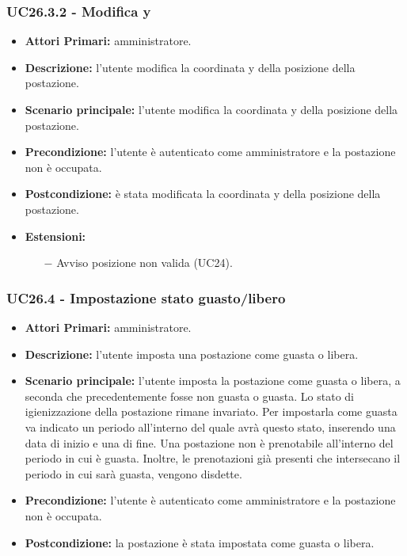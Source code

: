 \subsubsection{ UC26.3.2 - Modifica y}
\begin{itemize}
	\item\textbf{Attori Primari:}
	amministratore.
	\item\textbf{Descrizione:}
	l'utente modifica la coordinata y della posizione della postazione.
	\item\textbf{Scenario principale:} 
	l'utente modifica la coordinata y della posizione della postazione.
	\item\textbf{Precondizione:} 
	l'utente è autenticato come amministratore e la postazione non è occupata.
	\item\textbf{Postcondizione:}
	è stata modificata la coordinata y della posizione della postazione.
	\item\textbf{Estensioni:}
	\begin{itemize}
		\item[$-$] Avviso posizione non valida (UC24).
	\end{itemize}
\end{itemize}

\subsubsection{ UC26.4 - Impostazione stato guasto/libero}
\begin{itemize}
	\item\textbf{Attori Primari:}
	amministratore.
	\item\textbf{Descrizione:}
	l'utente imposta una postazione come guasta o libera.
	\item\textbf{Scenario principale:} 
	l'utente imposta la postazione come guasta o libera, a seconda che precedentemente fosse non guasta o guasta. Lo stato di igienizzazione della postazione rimane invariato. Per impostarla come guasta va indicato un periodo all'interno del quale avrà questo stato, inserendo una data di inizio e una di fine. \newline
	Una postazione non è prenotabile all'interno del periodo in cui è guasta. Inoltre, le prenotazioni già presenti che intersecano il periodo in cui sarà guasta, vengono disdette.
	\item\textbf{Precondizione:} 
	l'utente è autenticato come amministratore e la postazione non è occupata.
	\item\textbf{Postcondizione:}
	la postazione è stata impostata come guasta o libera.
\end{itemize}


